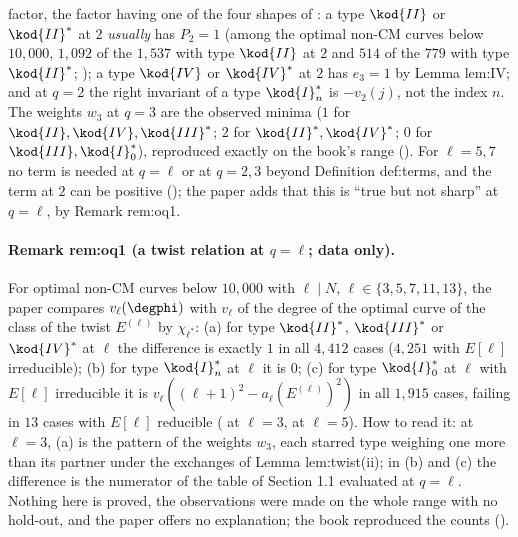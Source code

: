 \begin{sloppypar}
factor, the factor having one of the four shapes of : a type $\kod{II}$ or $\kod{II}^*$ at $2$ \emph{usually} has $P_2=1$ (among the optimal non-CM curves below
$10{,}000$, $1{,}092$ of the $1{,}537$ with type $\kod{II}$ at $2$ and $514$ of the $779$ with type $\kod{II}^*$; ); a type $\kod{IV}$ or $\kod{IV}^*$ at $2$ has $e_3=1$ by Lemma lem:IV;
and at $q=2$ the right invariant of a type $\kod{I}_n^*$ is $-v_2(j)$, not the index $n$. The weights $w_3$ at $q=3$ are the observed minima ($1$ for $\kod{II},\kod{IV},\kod{III}^*$; $2$ for
$\kod{II}^*,\kod{IV}^*$; $0$ for $\kod{III},\kod{I}_0^*$), reproduced exactly on the book's range (). For $\ell=5,7$ no term is needed at $q=\ell$ or at $q=2,3$ beyond Definition
def:terms, and the term at $2$ can be positive (); the paper adds that this is ``true but not sharp'' at $q=\ell$, by Remark rem:oq1.

\paragraph{Remark rem:oq1 (a twist relation at $q=\ell$; data only).} For optimal non-CM curves below $10{,}000$ with $\ell\mid N$, $\ell\in\{3,5,7,11,13\}$, the paper compares $v_\ell(\degphi)$ with
$v_\ell$ of the degree of the optimal curve of the class of the twist $E^{(\ell)}$ by $\chi_{\ell^*}$: (a) for type $\kod{II}^*$, $\kod{III}^*$ or $\kod{IV}^*$ at $\ell$ the difference is exactly $1$ in all
$4{,}412$ cases ($4{,}251$ with $E[\ell]$ irreducible); (b) for type $\kod{I}_n^*$ at $\ell$ it is $0$; (c) for type $\kod{I}_0^*$ at $\ell$ with $E[\ell]$ irreducible it is $v_\ell((\ell+1)^2-a_\ell(E^{(\ell)})^2)$
in all $1{,}915$ cases, failing in $13$ cases with $E[\ell]$ reducible ( at $\ell=3$,  at $\ell=5$). How to read it: at $\ell=3$, (a) is the pattern of the weights $w_3$, each
starred type weighing one more than its partner under the exchanges of Lemma lem:twist(ii); in (b) and (c) the difference is the numerator of the table of Section 1.1 evaluated at
$q=\ell$. Nothing here is proved, the observations were made on the whole range with no hold-out, and the paper offers no explanation; the book reproduced the counts
().


\end{sloppypar}
